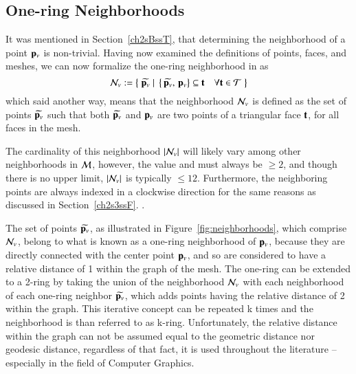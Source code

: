 %
%
%
\subsection{One-ring Neighborhoods}
\label{ch2s3ssNRN}
It was mentioned in Section~\ref{ch2sBssT}, that determining the neighborhood of a point $\mathbf{p}_v$ is non-trivial. Having now examined the definitions of points, faces, and meshes, we can now formalize the one-ring neighborhood in \tdd{} as
%
\begin{equation}
	\mathcal{N}_v := \left \{\;\widetilde{\mathbf{p}_v}\;|\;\left \{\,\widetilde{\mathbf{p}_v},\,\mathbf{p}_v\right \} \subseteq \mathbf{t} \quad \forall \mathbf{t} \in \mathcal{T}\;\right \}
	\label{eq:defineNeighborhood}
\end{equation}%
%
%
%
which said another way, means that the neighborhood $\mathcal{N}_v$ is defined as the set of points $\widetilde{\mathbf{p}_v}$ such that both $\widetilde{\mathbf{p}_v}$ and $\mathbf{p}_v$ are two points of a triangular face $\mathbf{t}$, for all faces in the mesh.

The cardinality of this neighborhood $|\mathcal{N}_v|$ will likely vary among other neighborhoods in $\mathcal{M}$, however, the value and must always be $\geq 2$, and though there is no upper limit, $|\mathcal{N}_v|$ is typically $\leq 12$. Furthermore, the neighboring points are always indexed in a clockwise direction for the same reasons as discussed in Section~\ref{ch2s3ssF}.
.%

The set of points $\widetilde{\mathbf{p}_v}$, as illustrated in Figure~\ref{fig:neighborhoods}, which comprise $\mathcal{N}_v$, belong to what is known as a one-ring neighborhood of $\mathbf{p}_v$, because they are directly connected with the center point $\mathbf{p}_v$, and so are considered to have a relative distance of 1 within the graph of the mesh. The one-ring can be extended to a 2-ring by taking the union of the neighborhood $\mathcal{N}_v$ with each neighborhood of each one-ring neighbor $\widetilde{\mathbf{p}_v}$, which adds points having the relative distance of 2 within the graph. This iterative concept can be repeated k times and the neighborhood is than referred to as k-ring. Unfortunately, the relative distance within the graph can not be assumed equal to the geometric distance nor geodesic distance, regardless of that fact, it is used throughout the literature – especially in the field of Computer Graphics.~\cite[p.~29]{Mara12}

